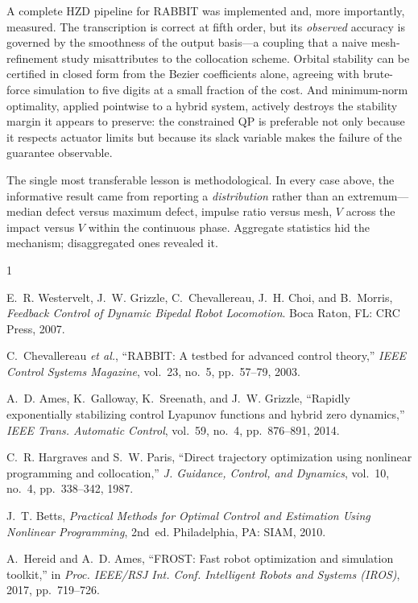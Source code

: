 \documentclass[10pt,conference]{IEEEtran}
\begin{document}
A complete HZD pipeline for RABBIT was implemented and, more importantly,
measured. The transcription is correct at fifth order, but its \emph{observed}
accuracy is governed by the smoothness of the output basis---a coupling that a
naive mesh-refinement study misattributes to the collocation scheme. Orbital
stability can be certified in closed form from the Bezier coefficients alone,
agreeing with brute-force simulation to five digits at a small fraction of the
cost. And minimum-norm optimality, applied pointwise to a hybrid system,
actively destroys the stability margin it appears to preserve: the constrained
QP is preferable not only because it respects actuator limits but because its
slack variable makes the failure of the guarantee observable.

The single most transferable lesson is methodological. In every case above, the
informative result came from reporting a \emph{distribution} rather than an
extremum---median defect versus maximum defect, impulse ratio versus mesh,
$V$ across the impact versus $V$ within the continuous phase. Aggregate
statistics hid the mechanism; disaggregated ones revealed it.

\begin{thebibliography}{1}

E.~R. Westervelt, J.~W. Grizzle, C.~Chevallereau, J.~H. Choi, and B.~Morris,
\emph{Feedback Control of Dynamic Bipedal Robot Locomotion}.
Boca Raton, FL: CRC Press, 2007.

C.~Chevallereau \emph{et al.},
``RABBIT: A testbed for advanced control theory,''
\emph{IEEE Control Systems Magazine}, vol.~23, no.~5, pp.~57--79, 2003.

A.~D. Ames, K.~Galloway, K.~Sreenath, and J.~W. Grizzle,
``Rapidly exponentially stabilizing control Lyapunov functions and hybrid zero
dynamics,''
\emph{IEEE Trans. Automatic Control}, vol.~59, no.~4, pp.~876--891, 2014.

C.~R. Hargraves and S.~W. Paris,
``Direct trajectory optimization using nonlinear programming and collocation,''
\emph{J. Guidance, Control, and Dynamics}, vol.~10, no.~4, pp.~338--342, 1987.

J.~T. Betts,
\emph{Practical Methods for Optimal Control and Estimation Using Nonlinear
Programming}, 2nd~ed.
Philadelphia, PA: SIAM, 2010.

A.~Hereid and A.~D. Ames,
``FROST: Fast robot optimization and simulation toolkit,''
in \emph{Proc. IEEE/RSJ Int. Conf. Intelligent Robots and Systems (IROS)}, 2017,
pp.~719--726.

\end{thebibliography}
\end{document}
